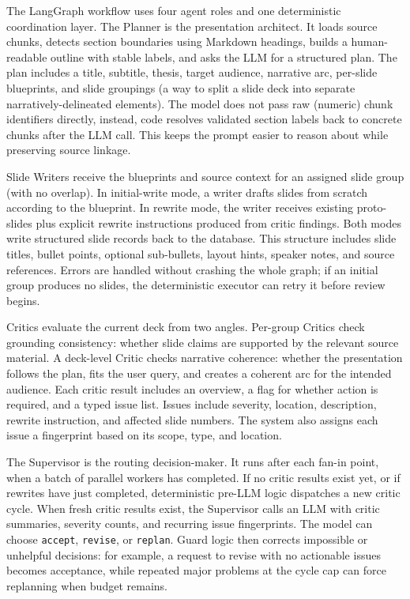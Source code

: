 \documentclass[11pt]{article}
\begin{document}
The LangGraph workflow uses four agent roles and one deterministic coordination layer. The Planner is the presentation architect. It loads source chunks, detects section boundaries using Markdown headings, builds a human-readable outline with stable labels, and asks the LLM for a structured plan. The plan includes a title, subtitle, thesis, target audience, narrative arc, per-slide blueprints, and slide groupings (a way to split a slide deck into separate narratively-delineated elements). The model does not pass raw (numeric) chunk identifiers directly, instead, code resolves validated section labels back to concrete chunks after the LLM call. This keeps the prompt easier to reason about while preserving source linkage.

Slide Writers receive the blueprints and source context for an assigned slide group (with no overlap). In initial-write mode, a writer drafts slides from scratch according to the blueprint. In rewrite mode, the writer receives existing proto-slides plus explicit rewrite instructions produced from critic findings. Both modes write structured slide records back to the database. This structure includes slide titles, bullet points, optional sub-bullets, layout hints, speaker notes, and source references. Errors are handled without crashing the whole graph; if an initial group produces no slides, the deterministic executor can retry it before review begins.

Critics evaluate the current deck from two angles. Per-group Critics check grounding consistency: whether slide claims are supported by the relevant source material. A deck-level Critic checks narrative coherence: whether the presentation follows the plan, fits the user query, and creates a coherent arc for the intended audience. Each critic result includes an overview, a flag for whether action is required, and a typed issue list. Issues include severity, location, description, rewrite instruction, and affected slide numbers. The system also assigns each issue a fingerprint based on its scope, type, and location.

The Supervisor is the routing decision-maker. It runs after each fan-in point, when a batch of parallel workers has completed. If no critic results exist yet, or if rewrites have just completed, deterministic pre-LLM logic dispatches a new critic cycle. When fresh critic results exist, the Supervisor calls an LLM with critic summaries, severity counts, and recurring issue fingerprints. The model can choose \texttt{accept}, \texttt{revise}, or \texttt{replan}. Guard logic then corrects impossible or unhelpful decisions: for example, a request to revise with no actionable issues becomes acceptance, while repeated major problems at the cycle cap can force replanning when budget remains.
\end{document}
